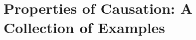 \documentclass[11pt,a4paper]{book}
\theoremstyle{definition}
\theoremstyle{definition}
\theoremstyle{definition}
\theoremstyle{remark}
\newcommand{\prset}{S_{A}}
\begin{document}




\chapter{Properties of Causation: A Collection of Examples}
\label{ch:survey_examples}
\end{document}
